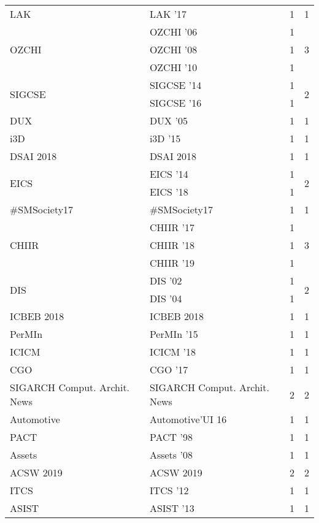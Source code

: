 \begin{table*}[t]
\begin{tabular}{llrr}
\multirow{1}{*}{LAK } & LAK '17 & 1 & \multirow{1}{*}{1}\\
\multirow{3}{*}{OZCHI } & OZCHI '06 & 1 & \multirow{3}{*}{3}\\
& OZCHI '08 & 1 &\\
& OZCHI '10 & 1 &\\
\multirow{2}{*}{SIGCSE } & SIGCSE '14 & 1 & \multirow{2}{*}{2}\\
& SIGCSE '16 & 1 &\\
\multirow{1}{*}{DUX } & DUX '05 & 1 & \multirow{1}{*}{1}\\
\multirow{1}{*}{i3D } & i3D '15 & 1 & \multirow{1}{*}{1}\\
\multirow{1}{*}{DSAI 2018} & DSAI 2018 & 1 & \multirow{1}{*}{1}\\
\multirow{2}{*}{EICS } & EICS '14 & 1 & \multirow{2}{*}{2}\\
& EICS '18 & 1 &\\
\multirow{1}{*}{\#SMSociety17} & \#SMSociety17 & 1 & \multirow{1}{*}{1}\\
\multirow{3}{*}{CHIIR } & CHIIR '17 & 1 & \multirow{3}{*}{3}\\
& CHIIR '18 & 1 &\\
& CHIIR '19 & 1 &\\
\multirow{2}{*}{DIS } & DIS '02 & 1 & \multirow{2}{*}{2}\\
& DIS '04 & 1 &\\
\multirow{1}{*}{ICBEB 2018} & ICBEB 2018 & 1 & \multirow{1}{*}{1}\\
\multirow{1}{*}{PerMIn } & PerMIn '15 & 1 & \multirow{1}{*}{1}\\
\multirow{1}{*}{ICICM } & ICICM '18 & 1 & \multirow{1}{*}{1}\\
\multirow{1}{*}{CGO } & CGO '17 & 1 & \multirow{1}{*}{1}\\
\multirow{1}{*}{SIGARCH Comput. Archit. News} & SIGARCH Comput. Archit. News & 2 & \multirow{1}{*}{2}\\
\multirow{1}{*}{Automotive} & Automotive'UI 16 & 1 & \multirow{1}{*}{1}\\
\multirow{1}{*}{PACT } & PACT '98 & 1 & \multirow{1}{*}{1}\\
\multirow{1}{*}{Assets } & Assets '08 & 1 & \multirow{1}{*}{1}\\
\multirow{1}{*}{ACSW 2019} & ACSW 2019 & 2 & \multirow{1}{*}{2}\\
\multirow{1}{*}{ITCS } & ITCS '12 & 1 & \multirow{1}{*}{1}\\
\multirow{1}{*}{ASIST } & ASIST '13 & 1 & \multirow{1}{*}{1}\\

\end{tabular}
\end{table*}

